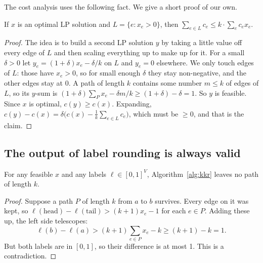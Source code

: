 \documentclass[sigconf,nonacm]{acmart}
\begin{document}
The cost analysis uses the following fact. We give a short proof of our own.
\begin{lemma}\label{lem:avg}
If $x$ is an optimal LP solution and $L=\{e:x_e>0\}$, then $\sum_{e\in L}c_e\le k\cdot\sum_ec_ex_e$.
\end{lemma}
\begin{proof}
The idea is to build a second LP solution $y$ by taking a little value off every edge of $L$ and then scaling everything up to make up for it. For a small $\delta>0$ let $y_e=(1+\delta)x_e-\delta/k$ on $L$ and $y_e=0$ elsewhere. We only touch edges of $L$: those have $x_e>0$, so for small enough $\delta$ they stay non-negative, and the other edges stay at $0$. A path of length $k$ contains some number $m\le k$ of edges of $L$, so its $y$-sum is $(1+\delta)\sum_Px_e-\delta m/k\ge(1+\delta)-\delta=1$. So $y$ is feasible. Since $x$ is optimal, $c(y)\ge c(x)$. Expanding, $c(y)-c(x)=\delta\big(c(x)-\frac1k\sum_{e\in L}c_e\big)$, which must be $\ge0$, and that is the claim.
\end{proof}

\subsection{The output of label rounding is always valid}
\begin{lemma}\label{lem:feas}
For any feasible $x$ and any labels $\ell\in[0,1]^V$, Algorithm~\ref{alg:kkr} leaves no path of length $k$.
\end{lemma}
\begin{proof}
Suppose a path $P$ of length $k$ from $a$ to $b$ survives. Every edge on it was kept, so $\ell(\text{head})-\ell(\text{tail})>(k+1)x_e-1$ for each $e\in P$. Adding these up, the left side telescopes:
\[\ell(b)-\ell(a)>(k+1)\textstyle\sum_{e\in P}x_e-k\ge(k+1)-k=1.\]
But both labels are in $[0,1]$, so their difference is at most 1. This is a contradiction.
\end{proof}
\end{document}
